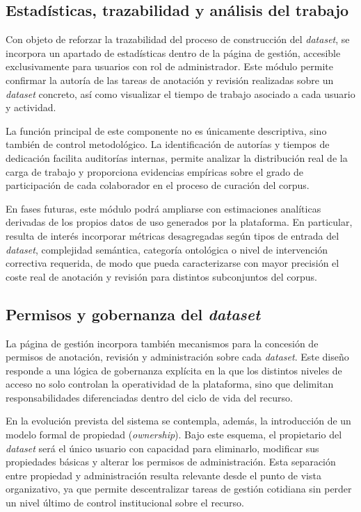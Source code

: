 \subsection{Estadísticas, trazabilidad y análisis del trabajo}

Con objeto de reforzar la trazabilidad del proceso de construcción del
\textit{dataset}, se incorpora un apartado de estadísticas dentro de la página
de gestión, accesible exclusivamente para usuarios con rol de administrador.
Este módulo permite confirmar la autoría de las tareas de anotación y revisión
realizadas sobre un \textit{dataset} concreto, así como visualizar el tiempo de
trabajo asociado a cada usuario y actividad.

La función principal de este componente no es únicamente descriptiva, sino
también de control metodológico. La identificación de autorías y tiempos de
dedicación facilita auditorías internas, permite analizar la distribución real
de la carga de trabajo y proporciona evidencias empíricas sobre el grado de
participación de cada colaborador en el proceso de curación del corpus.

En fases futuras, este módulo podrá ampliarse con estimaciones analíticas
derivadas de los propios datos de uso generados por la plataforma. En
particular, resulta de interés incorporar métricas desagregadas según tipos de
entrada del \textit{dataset}, complejidad semántica, categoría ontológica o
nivel de intervención correctiva requerida, de modo que pueda caracterizarse
con mayor precisión el coste real de anotación y revisión para distintos
subconjuntos del corpus.

\subsection{Permisos y gobernanza del \textit{dataset}}

La página de gestión incorpora también mecanismos para la concesión de permisos
de anotación, revisión y administración sobre cada \textit{dataset}. Este
diseño responde a una lógica de gobernanza explícita en la que los distintos
niveles de acceso no solo controlan la operatividad de la plataforma, sino que
delimitan responsabilidades diferenciadas dentro del ciclo de vida del recurso.

En la evolución prevista del sistema se contempla, además, la introducción de
un modelo formal de propiedad (\textit{ownership}). Bajo este esquema, el
propietario del \textit{dataset} será el único usuario con capacidad para
eliminarlo, modificar sus propiedades básicas y alterar los permisos de
administración. Esta separación entre propiedad y administración resulta
relevante desde el punto de vista organizativo, ya que permite descentralizar
tareas de gestión cotidiana sin perder un nivel último de control institucional
sobre el recurso.

